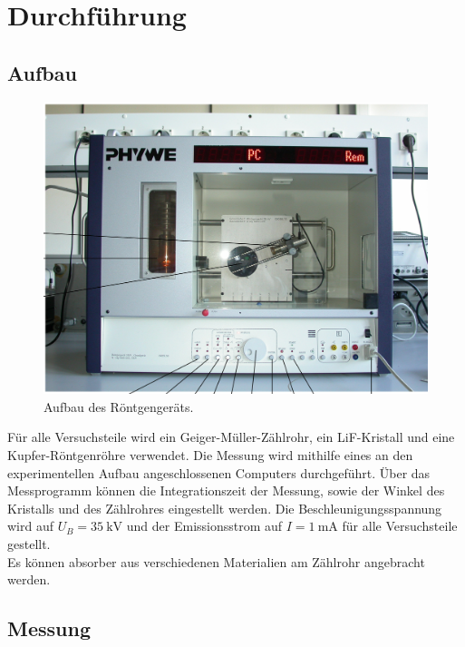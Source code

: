 \section{Durchführung}
\label{sec:Durchführung}

\subsection{Aufbau}

\begin{figure}[h!]
    \centering
    \includegraphics[width=\linewidth]{img/Aufbau_V602.png}
    \caption{Aufbau des Röntgengeräts.\cite{V602}}
    \label{fig:Aufbau}
\end{figure}

Für alle Versuchsteile wird ein Geiger-Müller-Zählrohr, ein LiF-Kristall
und eine Kupfer-Röntgenröhre verwendet. Die Messung wird mithilfe eines an den 
experimentellen Aufbau angeschlossenen Computers durchgeführt.
Über das Messprogramm können die Integrationszeit der Messung, sowie der Winkel des Kristalls und des Zählrohres eingestellt werden.
Die Beschleunigungsspannung wird auf $U_B = \SI{35}{\kilo\volt}$ und der Emissionsstrom auf $I = \SI{1}{\milli\ampere}$ für alle Versuchsteile gestellt.\\
Es können absorber aus verschiedenen Materialien am Zählrohr angebracht werden.\\

\subsection{Messung}

